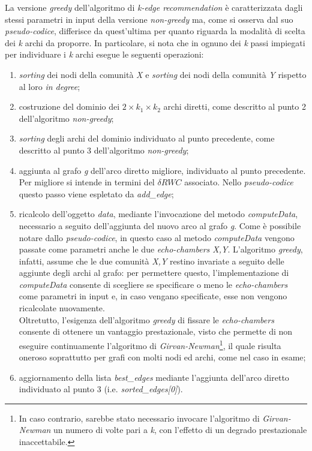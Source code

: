 La versione \textit{greedy} dell'algoritmo di \textit{k-edge recommendation} è caratterizzata dagli stessi parametri in input della versione \textit{non-greedy} ma, come si osserva dal suo \textit{pseudo-codice}, differisce da quest'ultima per quanto riguarda la modalità di scelta dei \textit{k} archi da proporre. In particolare, si nota che in ognuno dei \textit{k} passi impiegati per individuare i \textit{k} archi esegue le seguenti operazioni:
\begin{enumerate}
\item \textit{sorting} dei nodi della comunità \textit{X} e \textit{sorting} dei nodi della comunità \textit{Y} rispetto al loro \textit{in degree};
\item costruzione del dominio dei \textit{$2 \times k_1 \times k_2$} archi diretti, come descritto al punto 2 dell'algoritmo \textit{non-greedy}; 
\item \textit{sorting} degli archi del dominio individuato al punto precedente, come descritto al punto 3 dell'algoritmo \textit{non-greedy};
\item aggiunta al grafo \textit{g} dell'arco diretto migliore, individuato al punto precedente. Per migliore si intende in termini del \textit{$\delta RWC$} associato. Nello \textit{pseudo-codice} questo passo viene espletato da \textit{add\_edge};
\item ricalcolo dell'oggetto \textit{data}, mediante l'invocazione del metodo \textit{computeData}, necessario a seguito dell'aggiunta del nuovo arco al grafo \textit{g}. Come è possibile notare dallo \textit{pseudo-codice}, in questo caso al metodo \textit{computeData} vengono passate come parametri anche le due \textit{echo-chambers X,Y}. L'algoritmo \textit{greedy}, infatti, assume che le due comunità \textit{X,Y} restino invariate a seguito delle aggiunte degli archi al grafo: per permettere questo, l'implementazione di \textit{computeData} consente di scegliere se specificare o meno le \textit{echo-chambers} come parametri in input e, in caso vengano specificate, esse non vengono ricalcolate nuovamente.
\\Oltretutto, l'esigenza dell'algoritmo \textit{greedy} di fissare le \textit{echo-chambers} consente di ottenere un vantaggio prestazionale, visto che permette di non eseguire continuamente l'algoritmo di \textit{Girvan-Newman}\footnote{In caso contrario, sarebbe stato necessario invocare l'algoritmo di \textit{Girvan-Newman} un numero di volte pari a \textit{k}, con l'effetto di un degrado prestazionale inaccettabile.}, il quale risulta oneroso soprattutto per grafi con molti nodi ed archi, come nel caso in esame;
\item aggiornamento della lista \textit{best\_edges} mediante l'aggiunta dell'arco diretto individuato al punto 3 (i.e. \textit{sorted\_edges[0]}).
\end{enumerate}

